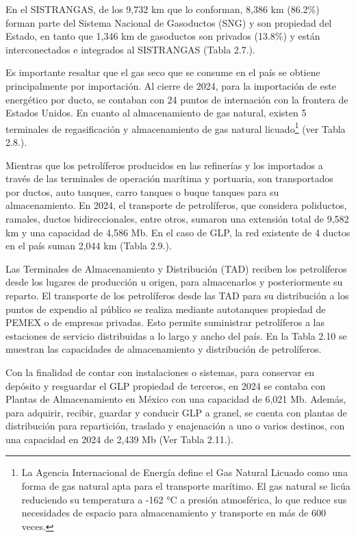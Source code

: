 \documentclass{sener2025}
\begin{document}
En el SISTRANGAS, de los 9,732 km que lo conforman, 8,386 km (86.2\%) forman parte del Sistema Nacional de Gasoductos (SNG) y son propiedad del Estado, en tanto que 1,346 km de gasoductos son privados (13.8\%) y están interconectados e integrados al SISTRANGAS (Tabla 2.7.).


Es importante resaltar que el gas seco que se consume en el país se obtiene principalmente por importación. Al cierre de 2024, para la importación de este energético por ducto, se contaban con 24 puntos de internación con la frontera de Estados Unidos. En cuanto al almacenamiento de gas natural, existen 5 terminales de regasificación y almacenamiento de gas natural licuado\footnote{La Agencia Internacional de Energía define el Gas Natural Licuado como una forma de gas natural apta para el transporte marítimo. El gas natural se licúa reduciendo su temperatura a -162 °C a presión atmosférica, lo que reduce sus necesidades de espacio para almacenamiento y transporte en más de 600 veces.} (ver Tabla 2.8.).


Mientras que los petrolíferos producidos en las refinerías y los importados a través de las terminales de operación marítima y portuaria, son transportados por ductos, auto tanques, carro tanques o buque tanques para su almacenamiento. En 2024, el transporte de petrolíferos, que considera poliductos, ramales, ductos bidireccionales, entre otros, sumaron una extensión total de 9,582 km y una capacidad de 4,586 Mb. En el caso de GLP, la red existente de 4 ductos en el país suman 2,044 km (Tabla 2.9.).


Las Terminales de Almacenamiento y Distribución (TAD) reciben los petrolíferos desde los lugares de producción u origen, para almacenarlos y posteriormente su reparto. El transporte de los petrolíferos desde las TAD para su distribución a los puntos de expendio al público se realiza mediante autotanques propiedad de PEMEX o de empresas privadas. Esto permite suministrar petrolíferos a las estaciones de servicio distribuidas a lo largo y ancho del país. En la Tabla 2.10 se muestran las capacidades de almacenamiento y distribución de petrolíferos.


Con la finalidad de contar con instalaciones o sistemas, para conservar en depósito y resguardar el GLP propiedad de terceros, en 2024 se contaba con Plantas de Almacenamiento en México con una capacidad de 6,021 Mb. Además, para adquirir, recibir, guardar y conducir GLP a granel, se cuenta con plantas de distribución para repartición, traslado y enajenación a uno o varios destinos, con una capacidad en 2024 de 2,439 Mb (Ver Tabla 2.11.).
\end{document}
